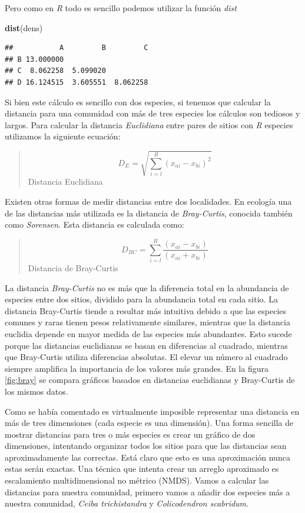 \documentclass[]{book}
\newenvironment{Shaded}{\begin{snugshade}}{\end{snugshade}}
\newcommand{\KeywordTok}[1]{\textcolor[rgb]{0.13,0.29,0.53}{\textbf{{#1}}}}
\newcommand{\NormalTok}[1]{{#1}}
\begin{document}
Pero como en \emph{R} todo es sencillo podemos utilizar la función
\emph{dist}

\begin{Shaded}
\begin{Highlighting}[]
\KeywordTok{dist}\NormalTok{(dens)}
\end{Highlighting}
\end{Shaded}

\begin{verbatim}
##           A         B         C
## B 13.000000                    
## C  8.062258  5.099020          
## D 16.124515  3.605551  8.062258
\end{verbatim}

Si bien este cálculo es sencillo con dos especies, si tenemos que
calcular la distancia para una comunidad con más de tres especies los
cálculos son tediosos y largos. Para calcular la distancia
\emph{Euclidiana} entre pares de sitios con \emph{R} especies utilizamos
la siguiente ecuación:

\begin{quote}
\[D_E = \sqrt{\sum_{i=l}^R (x_{ai} - x_{bi})^2}\] Distancia Euclidiana
\end{quote}

Existen otras formas de medir distancias entre dos localidades. En
ecología una de las distancias más utilizada es la distancia de
\emph{Bray-Curtis}, conocida también como \emph{Sorensen}. Esta
distancia es calculada como:

\begin{quote}
\[D_{BC} = \sum_{i=l}^R \frac{(x_{ai} - x_{bi})}{(x_{ai} + x_{bi})}\]
Distancia de Bray-Curtis
\end{quote}

La distancia \emph{Bray-Curtis} no es más que la diferencia total en la
abundancia de especies entre dos sitios, dividido para la abundancia
total en cada sitio. La distancia Bray-Curtis tiende a resultar más
intuitiva debido a que las especies comunes y raras tienen pesos
relativamente similares, mientras que la distancia euclidia depende en
mayor medida de las especies más abundantes. Esto sucede porque las
distancias euclidianas se basan en diferencias al cuadrado, mientras que
Bray-Curtis utiliza diferencias absolutas. El elevar un número al
cuadrado siempre amplifica la importancia de los valores más grandes. En
la figura \ref{fig:bray} se compara gráficos basados en distancias
euclidianas y Bray-Curtis de los mismos datos.

Como se había comentado es virtualmente imposible representar una
distancia en más de tres dimensiones (cada especie es una dimensión).
Una forma sencilla de mostrar distancias para tres o más especies es
crear un gráfico de dos dimensiones, intentando organizar todos los
sitios para que las distancias sean aproximadamente las correctas. Está
claro que esto es una aproximación nunca estas serán exactas. Una
técnica que intenta crear un arreglo aproximado es escalamiento
multidimensional no métrico (NMDS). Vamos a calcular las distancias para
nuestra comunidad, primero vamos a añadir dos especies más a nuestra
comunidad, \emph{Ceiba trichistandra} y \emph{Colicodendron scabridum}.
\end{document}
